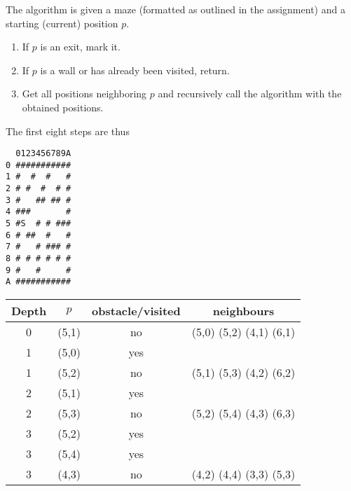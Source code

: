 \documentclass{article}
\begin{document}
The algorithm is given a maze (formatted as outlined in the assignment) and a starting (current) position $p$.

\begin{enumerate}
    \item If $p$ is an exit, mark it.
    \item If $p$ is a wall or has already been visited, return.
    \item Get all positions neighboring $p$ and recursively call the algorithm with the obtained positions.
\end{enumerate}

The first eight steps are thus

\begin{minipage}{.25\linewidth}
    \centering
    \begin{verbatim}
  0123456789A
0 ###########
1 #  #  #   #
2 # #  #  # #
3 #   ## ## #
4 ###       #
5 #S  # # ###
6 # ##  #   #
7 #   # ### #
8 # # # # # #
9 #   #     #
A ###########
    \end{verbatim}
\end{minipage}
\hfill
\begin{minipage}{.74\linewidth}
    \centering
    \begin{tabular}{c c c c}\toprule
        Depth & $p$ & obstacle/visited & neighbours \\\midrule
        0 & (5,1) & no & (5,0) (5,2) (4,1) (6,1) \\
        1 & (5,0) & yes & \\
        1 & (5,2) & no & (5,1) (5,3) (4,2) (6,2) \\
        2 & (5,1) & yes & \\
        2 & (5,3) & no & (5,2) (5,4) (4,3) (6,3) \\
        3 & (5,2) & yes & \\
        3 & (5,4) & yes & \\
        3 & (4,3) & no & (4,2) (4,4) (3,3) (5,3) \\\bottomrule
    \end{tabular}
\end{minipage}
\end{document}
